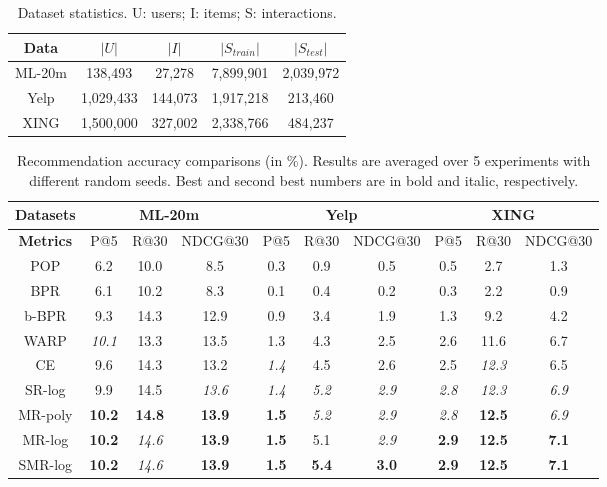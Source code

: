 \documentclass[letterpaper]{article}
\makeatletter
\newcommand{\ndcg}{{\textsc{NDCG@30}}}
\newcommand{\pre}{{\textsc{P@5}}}
\newcommand{\rec}{{\textsc{R@30}}}
\newcommand{\pop}{\textsc{POP}}
\newcommand{\awarp}{\textsc{WARP}}
\newcommand{\bbpr}{b-BPR}
\newcommand{\bpr}{BPR}
\newcommand{\xing}{\textsf{XING}}
\newcommand{\yelp}{\textsf{Yelp}}
\newcommand{\movietwenty}{\textsf{ML-20m}}
\makeatother
\begin{document}
\begin{table}
\centering
\small{
\begin{adjustbox}{width=0.04\columnwidth}
\begin{tabular}{|c|c|c|c|c|}
\hline
\textbf{Data}   & $\left|U\right|$ & $\left|I\right|$ & $\left|S_{train}\right|$ & $\left|S_{test}\right|$ \\
\hline
\movietwenty   & 138,493  & 27,278 & 7,899,901 & 2,039,972  \\ \hline
\yelp       & 1,029,433     & 144,073  &  1,917,218 & 213,460  \\ \hline
\xing       & 1,500,000     & 327,002  & 2,338,766  & 484,237  \\ \hline
\end{tabular}
\end{adjustbox}
}
\caption{Dataset statistics. U: users; I: items; S: interactions.}
\label{t:data1}
\end{table}

\begin{table}[!t]
\centering
\begin{adjustbox}{width=0.06\columnwidth}
\begin{tabular}{|c||c|c|c||c|c|c||  c| c| c|} \hline
\textbf{Datasets}  & \multicolumn{3}{c||}{\movietwenty} & \multicolumn{3}{|c||}{\yelp}  & \multicolumn{3}{|c|}{\xing} \\ \hline
\textbf{Metrics}  & \pre  & \rec  & \ndcg  & \pre  & \rec    & \ndcg  & \pre  & \rec  & \ndcg  \\ \hline
 \pop         &6.2&10.0&8.5  &0.3&0.9&0.5    &0.5&2.7&1.3  \\ \hline
\bpr          &6.1 &10.2 & 8.3 &0.1 & 0.4&0.2 &0.3 &2.2 &0.9 \\ \hline
\bbpr     &9.3 &14.3 &12.9  &0.9&3.4&1.9 &1.3& 9.2 & 4.2  \\ \hline%
\awarp      &\textit{10.1}&13.3&13.5 &1.3&4.3&2.5     &2.6&11.6 &6.7\\ \hline
CE      &9.6&14.3&13.2  &\textit{1.4}&4.5&2.6  &2.5& \textit{12.3} & 6.5 \\ \hline\hline%
SR-log        &9.9 & 14.5  &\textit{13.6}  &\textit{1.4} & \textit{5.2} &\textit{2.9}  &\textit{2.8}  &\textit{12.3}  &\textit{6.9} \\ \hline%
MR-poly      &\textbf{10.2} &\textbf{14.8} &\textbf{13.9}    &\textbf{1.5} &\textit{5.2} & \textit{2.9}  &\textit{2.8}  &\textbf{12.5}  &\textit{6.9}\\ \hline%
MR-log        &\textbf{10.2}&\textit{14.6}&\textbf{13.9}  &\textbf{1.5}& 5.1& \textit{2.9}   &\textbf{2.9}& \textbf{12.5}&\textbf{7.1}\\ \hline
SMR-log      &\textbf{10.2} &\textit{14.6} &\textbf{13.9}   &\textbf{1.5}& \textbf{5.4}& \textbf{3.0}  &\textbf{2.9}& \textbf{12.5} & \textbf{7.1} \\ \hline%
\end{tabular}
\end{adjustbox}
\caption{Recommendation accuracy comparisons (in \%). Results are averaged over 5 experiments with different random seeds. Best and second best numbers are in bold and italic, respectively.}
\label{t:accuracy}
\end{table}
\end{document}

